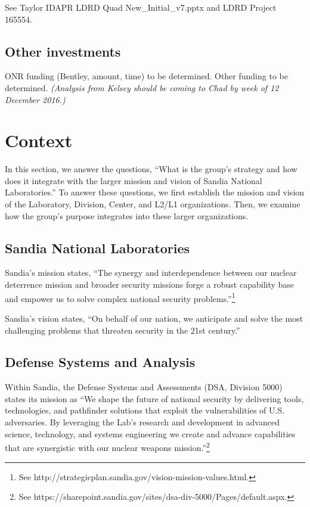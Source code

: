 \documentclass[12pt,reqno]{amsart}
\begin{document}
See Taylor IDAPR LDRD Quad New\_Initial\_v7.pptx and LDRD Project 165554.

\subsection{Other investments}
ONR funding (Bentley, amount, time) to be determined.  Other funding to be 
determined. 
{\em 
(Analysis from Kelsey should be coming to Chad by week of 12 December 2016.)
}
											
\section{Context}

In this section, we answer the questions, ``What is the group's strategy and 
how does it integrate with the larger mission and vision of 
Sandia National Laboratories.''  To answer these questions, we first 
establish the mission and vision of the Laboratory, Division, Center, and
L2/L1 organizations.  Then, we examine
how the group's purpose integrates into these larger organizations.

\subsection{Sandia National Laboratories}	
Sandia's mission states, ``The synergy and interdependence between our nuclear 
deterrence mission and broader security missions forge a robust capability 
base and empower us to solve complex national security 
problems.''\footnote{See http://strategicplan.sandia.gov/vision-mission-values.html.}

Sandia's vision states, ``On behalf of our nation, we anticipate and solve the most challenging problems that threaten security in the 21st century.''

\subsection{Defense Systems and Analysis}
Within Sandia, the Defense Systems and Assessments (DSA, Division 5000) states 
its mission as ``We shape the future of national security by delivering tools, 
technologies, and pathfinder solutions that exploit the vulnerabilities of 
U.S. adversaries.  By leveraging the Lab's research and development in 
advanced science, technology, and systems engineering we create and advance 
capabilities that are synergistic with our nuclear weapons 
mission.''\footnote{See https://sharepoint.sandia.gov/sites/dsa-div-5000/Pages/default.aspx.}
\end{document}
